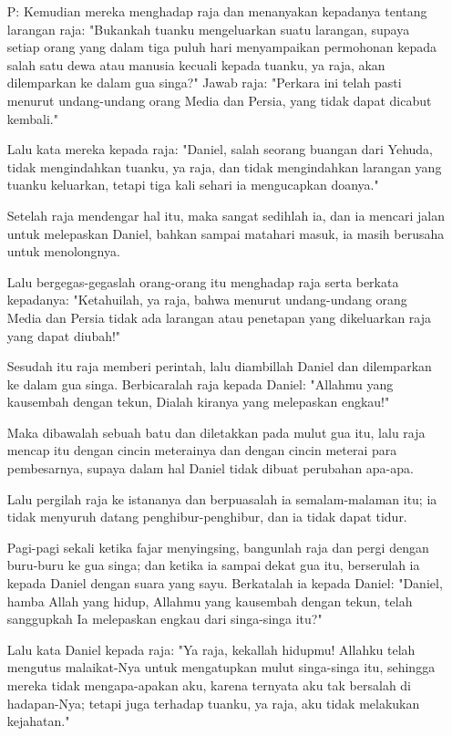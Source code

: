 \documentclass[a5paper,titlepage,10pt,openany]{scrbook}
\newcommand{\BP}[1]{\begin{itemize} \item[P:] #1 \end{itemize}}
\begin{document}
\BP{Kemudian mereka menghadap raja dan menanyakan kepadanya tentang larangan raja: "Bukankah tuanku mengeluarkan suatu larangan, supaya setiap orang yang dalam tiga puluh hari menyampaikan permohonan kepada salah satu dewa atau manusia kecuali kepada tuanku, ya raja, akan dilemparkan ke dalam gua singa?" Jawab raja: "Perkara ini telah pasti menurut undang-undang orang Media dan Persia, yang tidak dapat dicabut kembali."

Lalu kata mereka kepada raja: "Daniel, salah seorang buangan dari Yehuda, tidak mengindahkan tuanku, ya raja, dan tidak mengindahkan larangan yang tuanku keluarkan, tetapi tiga kali sehari ia mengucapkan doanya."

Setelah raja mendengar hal itu, maka sangat sedihlah ia, dan ia mencari jalan untuk melepaskan Daniel, bahkan sampai matahari masuk, ia masih berusaha untuk menolongnya.

Lalu bergegas-gegaslah orang-orang itu menghadap raja serta berkata kepadanya: "Ketahuilah, ya raja, bahwa menurut undang-undang orang Media dan Persia tidak ada larangan atau penetapan yang dikeluarkan raja yang dapat diubah!"

Sesudah itu raja memberi perintah, lalu diambillah Daniel dan dilemparkan ke dalam gua singa. Berbicaralah raja kepada Daniel: "Allahmu yang kausembah dengan tekun, Dialah kiranya yang melepaskan engkau!"

Maka dibawalah sebuah batu dan diletakkan pada mulut gua itu, lalu raja mencap itu dengan cincin meterainya dan dengan cincin meterai para pembesarnya, supaya dalam hal Daniel tidak dibuat perubahan apa-apa.

Lalu pergilah raja ke istananya dan berpuasalah ia semalam-malaman itu; ia tidak menyuruh datang penghibur-penghibur, dan ia tidak dapat tidur.

Pagi-pagi sekali ketika fajar menyingsing, bangunlah raja dan pergi dengan buru-buru ke gua singa;
dan ketika ia sampai dekat gua itu, berserulah ia kepada Daniel dengan suara yang sayu. Berkatalah ia kepada Daniel: "Daniel, hamba Allah yang hidup, Allahmu yang kausembah dengan tekun, telah sanggupkah Ia melepaskan engkau dari singa-singa itu?"

Lalu kata Daniel kepada raja: "Ya raja, kekallah hidupmu!
Allahku telah mengutus malaikat-Nya untuk mengatupkan mulut singa-singa itu, sehingga mereka tidak mengapa-apakan aku, karena ternyata aku tak bersalah di hadapan-Nya; tetapi juga terhadap tuanku, ya raja, aku tidak melakukan kejahatan."

}
\end{document}
